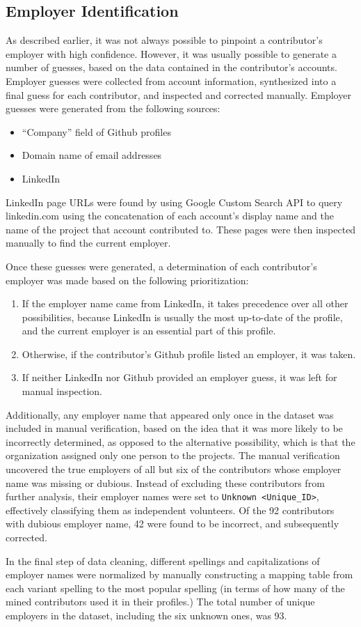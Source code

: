 \subsection{Employer Identification}
As described earlier, it was not always possible to pinpoint a contributor's employer with high confidence. However, it was usually possible to generate a number of guesses, 
based on the data contained in the contributor's accounts. Employer guesses were collected from account information, synthesized into a final guess for each contributor, and inspected and corrected manually.
Employer guesses were generated from the following sources:
\begin{itemize}
	\item ``Company'' field of Github profiles
	\item Domain name of email addresses
	\item LinkedIn
\end{itemize}
LinkedIn page URLs were found by using Google Custom Search API to query linkedin.com using the concatenation of each account's display name and the name of the project that account contributed to. These pages were then inspected manually to find the current employer. 

Once these guesses were generated, a determination of each contributor's employer was made based on the following prioritization:
\begin{enumerate}
	\item If the employer name came from LinkedIn, it takes precedence over all other possibilities, because LinkedIn is usually the most up-to-date of the profile, and the current employer is an essential part of this profile.
	\item Otherwise, if the contributor's Github profile listed an employer, it was taken.
	\item If neither LinkedIn nor Github provided an employer guess, it was left for manual inspection.
\end{enumerate}
Additionally, any employer name that appeared only once in the dataset was included in manual verification, based on the idea that it was more likely to be incorrectly determined, as opposed to the alternative possibility, which is that the organization assigned only one person to the projects.
The manual verification uncovered the true employers of all but six of the contributors whose employer name was missing or dubious. Instead of excluding these contributors from further analysis, their employer names were set to \verb|Unknown <Unique_ID>|, effectively classifying them as independent volunteers. Of the 92 contributors with dubious employer name, 42 were found to be incorrect, and subsequently corrected.

In the final step of data cleaning, different spellings and capitalizations of employer names were normalized by manually constructing a mapping table from each variant spelling to the most popular spelling (in terms of how many of the mined contributors used it in their profiles.) The total number of unique employers in the dataset, including the six unknown ones, was 93.